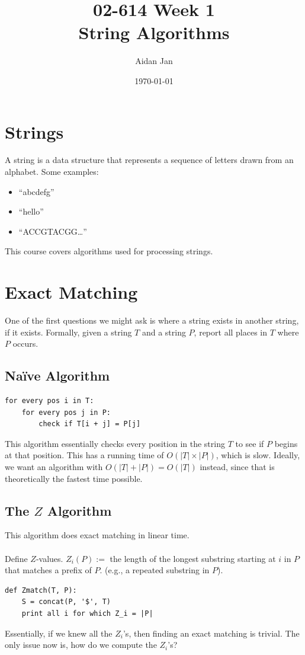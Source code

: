 \documentclass[10pt]{article}
\title{02-614 Week 1 \\ \large{String Algorithms}}
\author{Aidan Jan}
\date{\today}
\begin{document}
\maketitle

\section*{Strings}
A string is a data structure that represents a sequence of letters drawn from an alphabet.  Some examples:
\begin{itemize}
	\item ``abcdefg''
	\item ``hello''
	\item ``ACCGTACGG\dots''
\end{itemize}
This course covers algorithms used for processing strings.

\section*{Exact Matching}
One of the first questions we might ask is where a string exists in another string, if it exists.  Formally, given a string $T$ and a string $P$, report all places in $T$ where $P$ occurs.

\subsection*{Na\"ive Algorithm}
\begin{verbatim}
for every pos i in T:
    for every pos j in P:
        check if T[i + j] = P[j]
\end{verbatim}
This algorithm essentially checks every position in the string $T$ to see if $P$ begins at that position.  This has a running time of $O(|T| \times |P|)$, which is slow.  Ideally, we want an algorithm with $O(|T| + |P|) = O(|T|)$ instead, since that is theoretically the fastest time possible.

\subsection*{The $Z$ Algorithm}
This algorithm does exact matching in linear time.\\\\
Define $Z$-values.  $Z_i(P) :=$ the length of the longest substring starting at $i$ in $P$ that matches a prefix of $P$.  (e.g., a repeated substring in $P$).
\begin{verbatim}
def Zmatch(T, P):
    S = concat(P, '$', T)
    print all i for which Z_i = |P|
\end{verbatim}
Essentially, if we knew all the $Z_i$'s, then finding an exact matching is trivial.  The only issue now is, how do we compute the $Z_i$'s?
\end{document}
